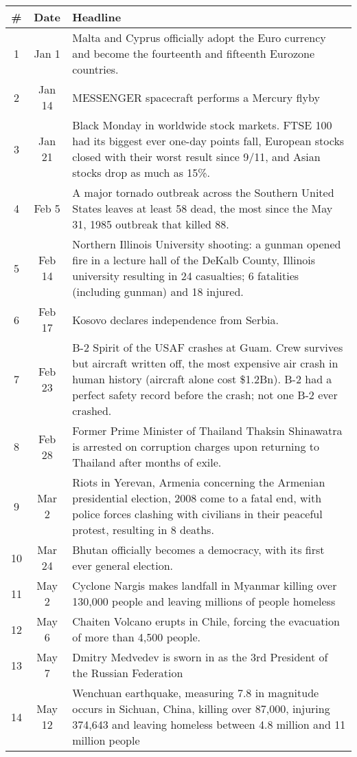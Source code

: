 \documentclass[a4paper]{article}
\begin{document}
\begin{center}
\begin{tabularx}{\linewidth}{@{}c @{}c X@{}}\toprule[1.5pt]
\bf \# & \bf Date & \bf Headline \\ \midrule
1 & Jan 1 & Malta and Cyprus officially adopt the Euro currency and become the fourteenth and fifteenth Eurozone countries. \\
2 & Jan 14 & MESSENGER spacecraft performs a Mercury flyby \\
3 & Jan 21 & Black Monday in worldwide stock markets. FTSE 100 had its biggest ever one-day points fall, European stocks closed with their worst result since 9/11, and Asian stocks drop as much as 15\%. \\
4 & Feb 5 & A major tornado outbreak across the Southern United States leaves at least 58 dead, the most since the May 31, 1985 outbreak that killed 88. \\
5 & Feb 14 & Northern Illinois University shooting: a gunman opened fire in a lecture hall of the DeKalb County, Illinois university resulting in 24 casualties; 6 fatalities (including gunman) and 18 injured. \\
6 & Feb 17 & Kosovo declares independence from Serbia. \\
7 & Feb 23 & B-2 Spirit of the USAF crashes at Guam. Crew survives but aircraft written off, the most expensive air crash in human history (aircraft alone cost \$1.2Bn). B-2 had a perfect safety record before the crash; not one B-2 ever crashed. \\
8 & Feb 28 & Former Prime Minister of Thailand Thaksin Shinawatra is arrested on corruption charges upon returning to Thailand after months of exile. \\
9 & Mar 2 & Riots in Yerevan, Armenia concerning the Armenian presidential election, 2008 come to a fatal end, with police forces clashing with civilians in their peaceful protest, resulting in 8 deaths. \\
10 & Mar 24 & Bhutan officially becomes a democracy, with its first ever general election. \\
11 & May 2 & Cyclone Nargis makes landfall in Myanmar killing over 130,000 people and leaving millions of people homeless \\
12 & May 6 & Chaiten Volcano erupts in Chile, forcing the evacuation of more than 4,500 people. \\
13 & May 7 & Dmitry Medvedev is sworn in as the 3rd President of the Russian Federation \\
14 & May 12 & Wenchuan earthquake, measuring 7.8 in magnitude occurs in Sichuan, China, killing over 87,000, injuring 374,643 and leaving homeless between 4.8 million and 11 million people \\

\end{tabularx}
\end{center}
\end{document}
